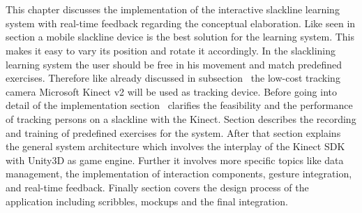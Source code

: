 \chapter{}\label{5_systemIntegration}
This chapter discusses the implementation of the interactive slackline learning system with real-time feedback regarding the conceptual elaboration. Like seen in section \textit{} a mobile slackline device is the best solution for the learning system. This makes it easy to vary its position and rotate it accordingly. In the slacklining learning system the user should be free in his movement and match predefined exercises. Therefore like already discussed in subsection~\textit{} the low-cost tracking camera Microsoft Kinect v2 will be used as tracking device. Before going into detail of the implementation section~\textit{} clarifies the feasibility and the performance of tracking persons on a slackline with the Kinect. Section \textit{} describes the recording and training of predefined exercises for the system. After that section \textit{} explains the general system architecture which involves the interplay of the Kinect SDK with Unity3D as game engine. Further it involves more specific topics like data management, the implementation of interaction components, gesture integration, and real-time feedback. Finally section \textit{} covers the design process of the application including scribbles, mockups and the final integration.





